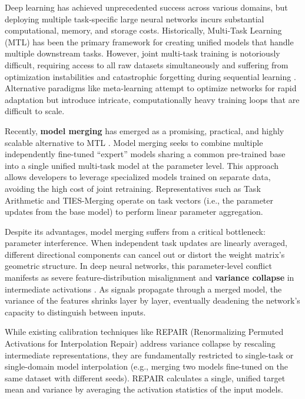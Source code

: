 \documentclass{article}
\theoremstyle{plain}
\theoremstyle{definition}
\theoremstyle{remark}
\begin{document}
Deep learning has achieved unprecedented success across various domains, but deploying multiple task-specific large neural networks incurs substantial computational, memory, and storage costs. Historically, Multi-Task Learning (MTL) \cite{caruana1997multitask} has been the primary framework for creating unified models that handle multiple downstream tasks. However, joint multi-task training is notoriously difficult, requiring access to all raw datasets simultaneously and suffering from optimization instabilities and catastrophic forgetting during sequential learning \cite{kirkpatrick2017overcoming, buzzega2020dark}. Alternative paradigms like meta-learning \cite{vinyals2016matching, finn2017model} attempt to optimize networks for rapid adaptation but introduce intricate, computationally heavy training loops that are difficult to scale.

Recently, \textbf{model merging} has emerged as a promising, practical, and highly scalable alternative to MTL \cite{wortsman2022robust, ilharco2022editing}. Model merging seeks to combine multiple independently fine-tuned ``expert'' models sharing a common pre-trained base into a single unified multi-task model at the parameter level. This approach allows developers to leverage specialized models trained on separate data, avoiding the high cost of joint retraining. Representatives such as Task Arithmetic \cite{ilharco2022editing} and TIES-Merging \cite{yadav2023ties} operate on task vectors (i.e., the parameter updates from the base model) to perform linear parameter aggregation.

Despite its advantages, model merging suffers from a critical bottleneck: parameter interference. When independent task updates are linearly averaged, different directional components can cancel out or distort the weight matrix's geometric structure. In deep neural networks, this parameter-level conflict manifests as severe feature-distribution misalignment and \textbf{variance collapse} in intermediate activations \cite{jordan2022repair}. As signals propagate through a merged model, the variance of the features shrinks layer by layer, eventually deadening the network's capacity to distinguish between inputs.

While existing calibration techniques like REPAIR (Renormalizing Permuted Activations for Interpolation Repair) \cite{jordan2022repair} address variance collapse by rescaling intermediate representations, they are fundamentally restricted to single-task or single-domain model interpolation (e.g., merging two models fine-tuned on the same dataset with different seeds). REPAIR calculates a single, unified target mean and variance by averaging the activation statistics of the input models. 
\end{document}

